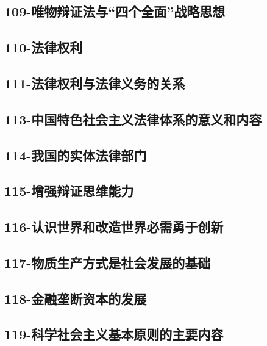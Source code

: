 \subsection{109-唯物辩证法与“四个全面”战略思想}

\subsection{110-法律权利}

\subsection{111-法律权利与法律义务的关系}

\subsection{113-中国特色社会主义法律体系的意义和内容}

\subsection{114-我国的实体法律部门}

\subsection{115-增强辩证思维能力}

\subsection{116-认识世界和改造世界必需勇于创新}

\subsection{117-物质生产方式是社会发展的基础}

\subsection{118-金融垄断资本的发展}

\subsection{119-科学社会主义基本原则的主要内容}

